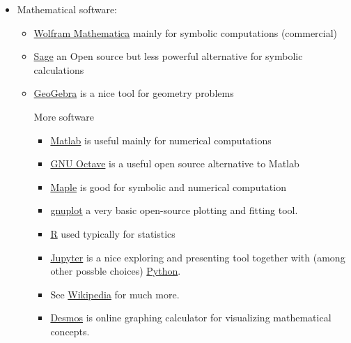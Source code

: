 \documentclass{article}
\begin{document}
\begin{itemize}
\begin{itemize}
    \end{itemize}
    
    \item Mathematical software:
    \begin{itemize}
        \item \href{https://www.wolfram.com/mathematica/}{Wolfram Mathematica} mainly for symbolic computations (commercial)
        
        \item \href{https://www.sagemath.org/}{Sage} an Open source but less powerful alternative for symbolic calculations
        
        \item \href{https://www.geogebra.org/}{GeoGebra} is a nice tool for geometry problems
        
        More software
        \begin{itemize}
            \item \href{https://www.mathworks.com/products/matlab.html}{Matlab} is useful mainly for numerical computations
        
            \item \href{https://octave.org/}{GNU Octave} is a useful open source alternative to Matlab

            \item \href{https://www.maplesoft.com/}{Maple} is good for symbolic and numerical computation
        
            \item \href{http://www.gnuplot.info/}{gnuplot} a very basic open-source plotting and fitting tool.
        
            \item \href{https://www.r-project.org/}{R} used typically for statistics
        
            \item \href{https://jupyter.org/}{Jupyter} is a nice exploring and presenting tool together with (among other possble choices) \href{https://www.python.org/}{Python}.
            
            \item See \href{https://en.wikipedia.org/wiki/List_of_open-source_software_for_mathematics}{Wikipedia} for much more.

            \item \href{https://www.desmos.com/calculator}{Desmos} is online graphing calculator for visualizing mathematical concepts.
        \end{itemize}
    \end{itemize}
    

\end{itemize}
\end{document}
